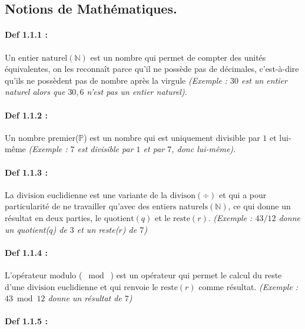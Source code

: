 \documentclass{article}
\begin{document}
\subsection{Notions de Mathématiques.}\label{notions-de-maths.}

\paragraph{Def 1.1.1 :}\label{def-1.1.1}

Un \(\text{entier naturel}(\mathbb{N})\) est un nombre qui permet de
compter des unités équivalentes, on les reconnaît parce qu'il ne possède
pas de décimales, c'est-à-dire qu'ils ne possèdent pas de nombre après
la virgule \textit{(Exemple : $30$ est un entier naturel alors que $30,6$
	n'est pas un entier naturel)}.

\paragraph{Def 1.1.2 :}\label{def-1.1.2}

Un nombre premier(\(\mathbb{P}\)) est un nombre qui est uniquement divisible par \(1\) et lui-même
\textit{(Exemple : $7$ est divisible par $1$ et par $7$, donc lui-même).}

\paragraph{Def 1.1.3 :}\label{def-1.1.3}

La \(\text{division euclidienne}\) est une variante de la
\(\text{divison}(\div)\) et qui a pour particularité de ne travailler
qu'avec des \(\text{entiers naturels}(\mathbb{N})\), ce qui donne un
résultat en deux parties, le \(\text{quotient}(q)\) et le
\(\text{reste}(r)\). \textit{(Exemple : $43 / 12$ donne un quotient($q$) de $3$ et un reste($r$) de $7$)}

\paragraph{Def 1.1.4 :}\label{def-1.1.4}

L'opérateur \(\text{modulo}\) (\(\;\bmod\;\)) est un opérateur qui
permet le calcul du reste d'une \(\text{division euclidienne}\) et
qui renvoie le \(\text{reste}(r)\) comme résultat. \textit{(Exemple : $43 \bmod 12$ donne un résultat de $7$)}

\paragraph{Def 1.1.5 :}\label{def-1.1.5}
\end{document}
